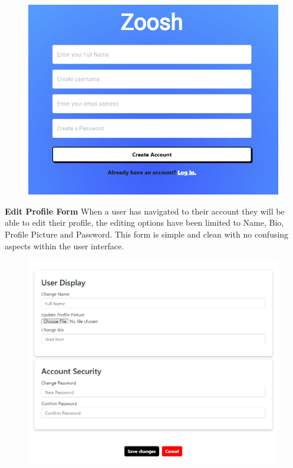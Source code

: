 \begin{figure}[H]
  \centering
  \includegraphics[scale=0.45]{img/join.PNG}
  \label{fig:Join Screen}
\end{figure}

\textbf{Edit Profile Form}
\newline
When a user has navigated to their account they will be able to edit their profile, the editing options have been limited to Name, Bio, Profile Picture and Password. This form is simple and clean with no confusing aspects within the user interface.

\begin{figure}[H]
  \centering
  \includegraphics[scale=0.45]{img/edit.PNG}
  \label{fig:Edit Profile Screen.}
\end{figure}

